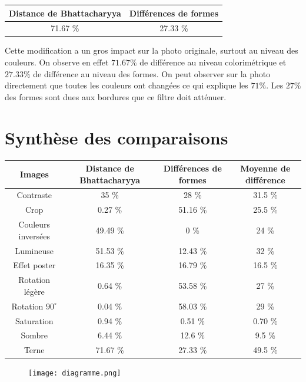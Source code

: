 \documentclass[]{article}
\begin{document}
\begin{description}
\begin{center}
\begin{tabular}{|c|c|}
  \hline
  Distance de Bhattacharyya & Différences de formes \\
  \hline
  71.67 \% & 27.33 \% \\
  \hline
\end{tabular}
\end{center}

Cette modification a un gros impact sur la photo originale, surtout au
niveau des couleurs. On observe en effet $71.67 \%$ de différence au
niveau colorimétrique et $27.33 \%$ de différence au niveau des formes.
On peut observer sur la photo directement que toutes les couleurs ont
changées ce qui explique les $71 \%$. Les $27 \%$ des formes sont dues aux
bordures que ce filtre doit atténuer.

\newpage

\section{Synthèse des comparaisons}\label{synthese-des-comparaisons}

\begin{center}
\begin{tabular}{|c|c|c||c|}
  \hline
  Images & Distance de Bhattacharyya & Différences de formes
    & Moyenne de différence \\
  \hline
  Contraste & 35 \% & 28 \% & 31.5 \% \\
  \hline
  Crop & 0.27 \% & 51.16 \% & 25.5 \% \\
  \hline
  Couleurs inversées & 49.49 \% & 0 \% & 24 \% \\
  \hline
  Lumineuse & 51.53 \% & 12.43 \% & 32 \% \\
  \hline
  Effet poster & 16.35 \% & 16.79 \% & 16.5 \% \\
  \hline
  Rotation légère & 0.64 \% & 53.58 \% & 27 \% \\
  \hline
  Rotation $90^{\circ}$ & 0.04 \% & 58.03 \% & 29 \% \\
  \hline
  Saturation & 0.94 \% & 0.51 \% & 0.70 \% \\
  \hline
  Sombre & 6.44 \% & 12.6 \% & 9.5 \% \\
  \hline
  Terne & 71.67 \% & 27.33 \% & 49.5 \% \\
  \hline
\end{tabular}
\end{center}

\begin{figure}[htbp]
\centering
\texttt{[image: diagramme.png]}
\caption{}
\end{figure}


\end{description}
\end{document}
